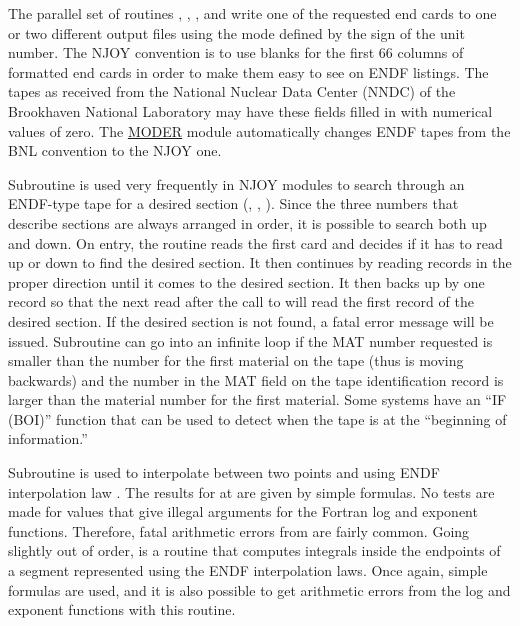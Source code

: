 The parallel set of routines , ,
, and  write one of the requested end cards
to one or two different output files using the mode defined by the
sign of the unit number.  The NJOY convention is to use blanks for
the first 66 columns of formatted end cards in order to make them easy
to see on ENDF listings.  The tapes as received from the National
Nuclear Data Center (NNDC) of the Brookhaven National Laboratory
may have these fields filled in with numerical values of zero.
The \hyperlink{sMODERhy}{MODER} module automatically changes
ENDF tapes from the BNL convention to the NJOY one.

Subroutine  is used very frequently in NJOY modules
to search through an ENDF-type tape for a desired section
(, , ).  Since the three numbers
that describe sections are always arranged in order, it is possible
to search both up and down.  On entry, the routine reads the first
card and decides if it has to read up or down to find the desired
section.  It then continues by reading records in the proper direction
until it comes to the desired section.  It then backs up by one record
so that the next read after the call to  will read the
first record of the desired section.  If the desired section is not
found, a fatal error message will be issued.  Subroutine 
can go into an infinite loop if the MAT number requested is smaller
than the number for the first material on the tape (thus 
is moving backwards) and the number in the MAT field on the tape
identification record is larger than the material number for the first
material.  Some systems have an ``IF (BOI)'' function that can be used
to detect when the tape is at the ``beginning of information.''

Subroutine  is used to interpolate between two points
 and  using ENDF interpolation law .
The results for  at  are given by simple formulas.
No tests are made for values that give illegal arguments for the Fortran
log and exponent functions.  Therefore, fatal arithmetic errors from
 are fairly common.  Going slightly out of order,
 is a routine that computes integrals inside the endpoints
of a segment represented using the ENDF interpolation laws.  Once again,
simple formulas are used, and it is also possible to get arithmetic
errors from the log and exponent functions with this routine.

